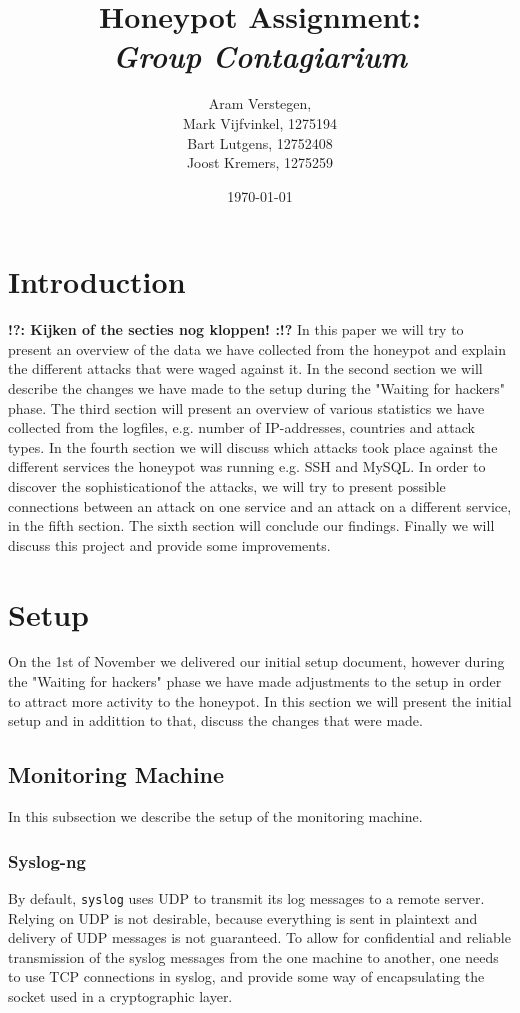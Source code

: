 \documentclass[11pt]{article}
\title{\textbf{Honeypot Assignment: \\ \emph{Group Contagiarium}}}
\author{Aram Verstegen, \tocheck{studentnummer Utwente} \\
	 Mark Vijfvinkel, 1275194 \\
	 Bart Lutgens, 12752408 \\
	Joost Kremers, 1275259}
\date{\today}
\newcommand{\tocheck}[1]{{\bf !?: #1 :!?}}
\begin{document}
\maketitle


\section{Introduction}
\tocheck{Kijken of the secties nog kloppen!}
In this paper we will try to present an overview of the data we have collected from the honeypot and explain the different attacks that were waged against it. 
In the second section we will describe the changes we have made to the setup during the "Waiting for hackers" phase. 
The third section will present an overview of various statistics we have collected from the logfiles, e.g. number of IP-addresses, countries and attack types. 
In the fourth section we will discuss which attacks took place against the different services the honeypot was running e.g. SSH and MySQL.
In order to discover the sophisticationof the attacks, we will try to present possible connections between an attack on one service and an attack on a different service, in the fifth section.
The sixth section will conclude our findings. 
Finally we will discuss this project and provide some improvements. 


\section{Setup}
\label{Setup}

On the 1st of November we delivered our initial setup document, however during the "Waiting for hackers" phase we have made adjustments to the setup in order to attract more activity to the honeypot. In this section we will present the initial setup and in addittion to that, discuss the changes that were made.


\subsection{Monitoring Machine}

In this subsection we describe the setup of the monitoring machine.

\subsubsection{Syslog-ng}
By default, \verb|syslog| uses UDP to transmit its log messages to a remote server.
Relying on UDP is not desirable, because everything is sent in plaintext and delivery of UDP messages is not guaranteed.
To allow for confidential and reliable transmission of the syslog messages from the one machine to another, one needs to use TCP connections in syslog, and provide some way of encapsulating the socket used in a cryptographic layer.
\end{document}
